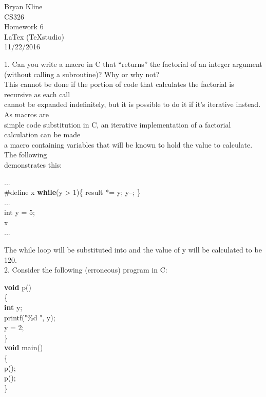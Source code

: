 \documentclass[12pt]{article}
\begin{document}
\begin{center}

\Huge
Bryan Kline\\
[10mm]
CS326\\ 
[10mm]
Homework 6\\
\small LaTex (TeXstudio)\\
[10mm]
\Huge
11/22/2016\\
[200mm]

\end{center}

\begin{flushleft}

1. Can you write a macro in C that “returns” the factorial of an integer argument
(without calling a subroutine)? Why or why not?\\
[2mm]

\qquad This cannot be done if the portion of code that calculates the factorial is recursive as each call\\
\qquad cannot be expanded indefinitely, but it is possible to do it if it's iterative instead.  As macros are\\
\qquad simple code substitution in C, an iterative implementation of a factorial calculation can be made\\
\qquad a macro containing variables that will be known to hold the value to calculate.  The following\\
\qquad demonstrates this:\\
[2mm]

{\selectfont

\qquad \qquad ...\\
\qquad \qquad \#define x \textbf{while}(y > 1)\{ result *= y; y--; \}\\
[2mm]
\qquad \qquad ...\\
\qquad \qquad int y = 5;\\
\qquad \qquad x\\
\qquad \qquad ...\\
[2mm]

}

\qquad The while loop will be substituted into and the value of {\selectfont y} will be calculated to be 120.\\ 
[4mm]

2. Consider the following (erroneous) program in C:\\
[2mm]

{\selectfont

\qquad \textbf{void} p()\\
\qquad \{\\
\qquad \qquad \textbf{int} y;\\
\qquad \qquad 	printf("\%d ", y);\\
\qquad \qquad 	y = 2;\\
\qquad \}\\
[2mm]
\qquad \textbf{void} main()\\
\qquad \{\\
\qquad \qquad 	p();\\
\qquad \qquad 	p();\\
\qquad \}\\
[2mm]
}


\end{flushleft}
\end{document}
